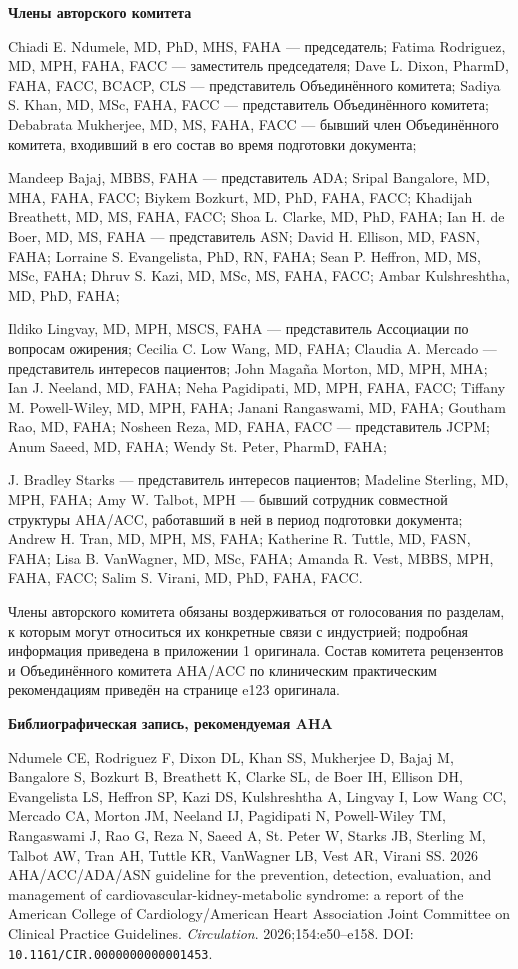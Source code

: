 \documentclass[11pt,a4paper]{article}
\newcommand{\heading}[1]{\par\medskip\textbf{#1}\par}
\begin{document}
\heading{Члены авторского комитета}
{\small
Chiadi E. Ndumele, MD, PhD, MHS, FAHA --- председатель; Fatima Rodriguez, MD, MPH, FAHA, FACC --- заместитель председателя; Dave L. Dixon, PharmD, FAHA, FACC, BCACP, CLS --- представитель Объединённого комитета; Sadiya S. Khan, MD, MSc, FAHA, FACC --- представитель Объединённого комитета; Debabrata Mukherjee, MD, MS, FAHA, FACC --- бывший член Объединённого комитета, входивший в его состав во время подготовки документа;

Mandeep Bajaj, MBBS, FAHA --- представитель ADA; Sripal Bangalore, MD, MHA, FAHA, FACC; Biykem Bozkurt, MD, PhD, FAHA, FACC; Khadijah Breathett, MD, MS, FAHA, FACC; Shoa L. Clarke, MD, PhD, FAHA; Ian H. de Boer, MD, MS, FAHA --- представитель ASN; David H. Ellison, MD, FASN, FAHA; Lorraine S. Evangelista, PhD, RN, FAHA; Sean P. Heffron, MD, MS, MSc, FAHA; Dhruv S. Kazi, MD, MSc, MS, FAHA, FACC; Ambar Kulshreshtha, MD, PhD, FAHA;

Ildiko Lingvay, MD, MPH, MSCS, FAHA --- представитель Ассоциации по вопросам ожирения; Cecilia C. Low Wang, MD, FAHA; Claudia A. Mercado --- представитель интересов пациентов; John Magaña Morton, MD, MPH, MHA; Ian J. Neeland, MD, FAHA; Neha Pagidipati, MD, MPH, FAHA, FACC; Tiffany M. Powell-Wiley, MD, MPH, FAHA; Janani Rangaswami, MD, FAHA; Goutham Rao, MD, FAHA; Nosheen Reza, MD, FAHA, FACC --- представитель JCPM; Anum Saeed, MD, FAHA; Wendy St. Peter, PharmD, FAHA;

J. Bradley Starks --- представитель интересов пациентов; Madeline Sterling, MD, MPH, FAHA; Amy W. Talbot, MPH --- бывший сотрудник совместной структуры AHA/ACC, работавший в ней в период подготовки документа; Andrew H. Tran, MD, MPH, MS, FAHA; Katherine R. Tuttle, MD, FASN, FAHA; Lisa B. VanWagner, MD, MSc, FAHA; Amanda R. Vest, MBBS, MPH, FAHA, FACC; Salim S. Virani, MD, PhD, FAHA, FACC.
}

Члены авторского комитета обязаны воздерживаться от голосования по разделам, к которым могут относиться их конкретные связи с индустрией; подробная информация приведена в приложении 1 оригинала. Состав комитета рецензентов и Объединённого комитета AHA/ACC по клиническим практическим рекомендациям приведён на странице e123 оригинала.

\heading{Библиографическая запись, рекомендуемая AHA}
{\small Ndumele CE, Rodriguez F, Dixon DL, Khan SS, Mukherjee D, Bajaj M, Bangalore S, Bozkurt B, Breathett K, Clarke SL, de Boer IH, Ellison DH, Evangelista LS, Heffron SP, Kazi DS, Kulshreshtha A, Lingvay I, Low Wang CC, Mercado CA, Morton JM, Neeland IJ, Pagidipati N, Powell-Wiley TM, Rangaswami J, Rao G, Reza N, Saeed A, St. Peter W, Starks JB, Sterling M, Talbot AW, Tran AH, Tuttle KR, VanWagner LB, Vest AR, Virani SS. 2026 AHA/ACC/ADA/ASN guideline for the prevention, detection, evaluation, and management of cardiovascular-kidney-metabolic syndrome: a report of the American College of Cardiology/American Heart Association Joint Committee on Clinical Practice Guidelines. \textit{Circulation}. 2026;154:e50--e158. DOI: \nolinkurl{10.1161/CIR.0000000000001453}.}
\end{document}

